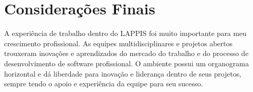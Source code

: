 \chapter[Considerações Finais]{Considerações Finais}
A experiência de trabalho dentro do LAPPIS foi muito importante para meu crescimento profissional. As equipes multidisciplinares e projetos abertos trouxeram inovações e aprendizados do mercado do trabalho e do processo de desenvolvimento de software profissional. O ambiente possui um organograma horizontal e dá liberdade para inovação e liderança dentro de seus projetos, sempre tendo o apoio e experiência da equipe para seu sucesso.